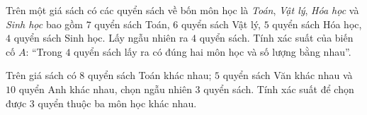 \begin{bt}%
	Trên một giá sách có các quyển sách về bốn môn học là \textit{Toán}, \textit{Vật lý}, \textit{Hóa học} và \textit{Sinh học} bao gồm $7$ quyển sách Toán, $6$ quyển sách Vật lý, $5$ quyển sách Hóa học, $4$ quyển sách Sinh học. Lấy ngẫu nhiên ra $4$ quyển sách. Tính xác suất của biến cố $A$: ``Trong $4$ quyển sách lấy ra có đúng hai môn học và số lượng bằng nhau''. 
\end{bt}

\begin{bt}%
Trên giá sách có $ 8 $ quyển sách Toán khác nhau; $ 5 $ quyển sách Văn khác nhau và $ 10 $ quyển Anh khác nhau, chọn ngẫu nhiên $ 3 $ quyển sách. Tính xác suất để chọn được $ 3 $ quyển thuộc ba môn học khác nhau.
\end{bt}

